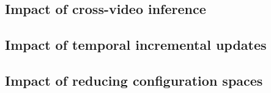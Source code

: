\subsection{Impact of cross-video inference}

\subsection{Impact of temporal incremental updates}

\subsection{Impact of reducing configuration spaces}